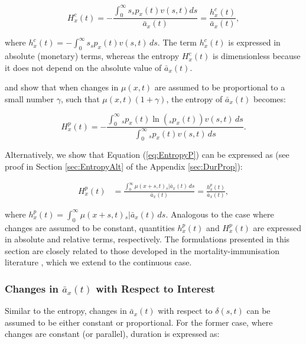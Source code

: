 \documentclass[12pt]{article}
\begin{document}
\begin{equation}\label{eq:EntropyC}
{H}^{c}_{x}(t) = -\frac{\int_{0}^\infty s {}_sp_x(t) {v}(s,t) ds}{\bar{a}_x(t)}=\frac{{h}^{c}_{x}(t)}{\bar{a}_x(t)},
\end{equation}

where ${h}^{c}_{x}(t)=-\int_{0}^\infty s {}_s p_x(t) {v}(s,t) \, ds$. The term ${h}^{c}_{x}(t)$ is expressed in absolute (monetary) terms, whereas the entropy ${H}^{c}_{x}(t)$ is dimensionless because it does not depend on the absolute value of $\bar{a}_x(t)$.

\citet{Haberman2011} and \citet{Tsai2013a} show that when changes in $\mu(x,t)$ are assumed to be proportional to a small number $\gamma$, such that $\mu(x,t)(1+\gamma)$, the entropy of $\bar{a}_x(t)$ becomes:

\begin{equation} \label{eq:EntropyP}
	{H}^{p}_{x}(t) = -\frac{ \int_{0}^{\infty}{}_s p_x(t)\ln\left({}_s p_x(t)\right) {v}(s,t) \, ds}{\int_0^\infty {}_s p_x(t) {v}(s,t) \, ds}.
\end{equation}

Alternatively, we show that Equation (\ref{eq:EntropyP}) can be expressed as (see proof in Section \ref{sec:EntropyAlt} of the Appendix \ref{sec:DurProp}):

\begin{equation} \label{eq:EntropyP2}
	\begin{split}
		{H}^{p}_{x}(t) &=  \frac{\int_0^\infty \mu(x+s,t)   {}_s|\bar{a}_x(t) \, ds}{\bar{a}_x(t)} =  \frac{{h}^{p}_{x}(t)}{\bar{a}_x(t)}, 
	\end{split}
\end{equation}

where ${h}^{p}_{x}(t)=\int_0^\infty \mu(x+s,t)   {}_s|\bar{a}_x(t) \, ds$. Analogous to the case where changes are assumed to be constant, quantities ${h}^{p}_{x}(t)$ and ${H}^{p}_{x}(t)$ are expressed in absolute and relative terms, respectively. The formulations presented in this section are closely related to those developed in the mortality-immunisation literature \citep{Tsai2013a,Lin2020}, which we extend to the continuous case.



\subsubsection{Changes in $\bar{a}_x(t)$ with Respect to Interest}


Similar to the entropy, changes in $\bar{a}_x(t)$ with respect to $\delta(s,t)$ can be assumed to be either constant or proportional. For the former case, where changes are constant (or parallel), duration is expressed as:
\end{document}
